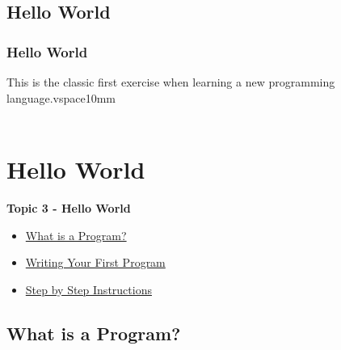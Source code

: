 \documentclass[fleqn]{ltx-talk} %
\newcommand{\sectionIIItitle}{Hello World}
\newcommand{\sectionIIsubsectionIVtitle}{Hello World}
\newcommand{\sectionIIIsubsectionItitle}{What is a Program?}
\newcommand{\sectionIIIsubsectionIItitle}{Writing Your First Program}
\newcommand{\sectionIIIsubsectionIIItitle}{Step by Step Instructions}
\newcommand{\sectionIIIsubsectionIVtitle}{-}
\begin{document}
		\subsection{\sectionIIsubsectionIVtitle}\label{sectionIIsubsectionIV}

			\begin{frame}
				\frametitle{\sectionIIsubsectionIVtitle}

				This is the classic first exercise when learning a new programming language.vspace{10mm}\\

				 \vspace{3mm}\\

				\btVFill 
			\end{frame}
 
	\section{\sectionIIItitle}\label{sectionIII}

		\begin{frame}
			\large \textbf{Topic 3 - \sectionIIItitle} \vspace{3mm}\\

			\begin{itemize}
				\item \hyperref[sectionIIIsubsectionI]{\sectionIIIsubsectionItitle} \vspc %
				\item \hyperref[sectionIIIsubsectionII]{\sectionIIIsubsectionIItitle} \vspc %
				\item \hyperref[sectionIIIsubsectionIII]{\sectionIIIsubsectionIIItitle} \vspc %
			\end{itemize}

		\end{frame}

		\subsection{\sectionIIIsubsectionItitle}\label{sectionIIIsubsectionI}
\end{document}
